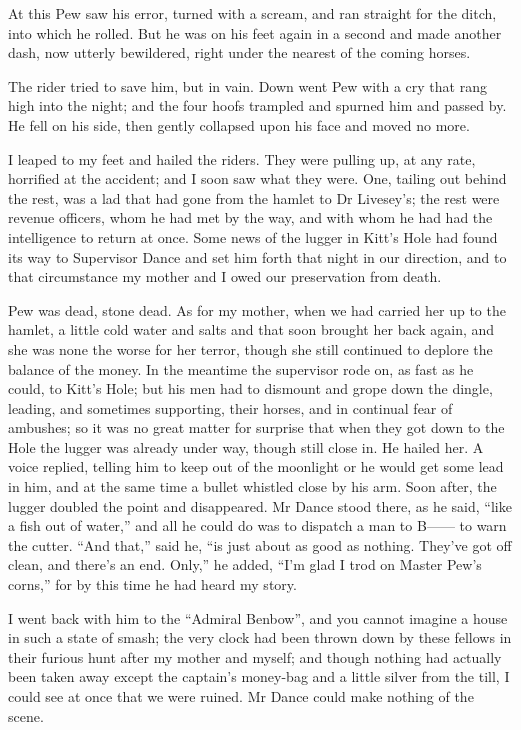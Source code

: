 At this Pew saw his error, turned with a scream, and ran straight for the ditch, into which he rolled. But he was on his feet again in a second and made another dash, now utterly bewildered, right under the nearest of the coming horses.

The rider tried to save him, but in vain. Down went Pew with a cry that rang high into the night; and the four hoofs trampled and spurned him and passed by. He fell on his side, then gently collapsed upon his face and moved no more.

I leaped to my feet and hailed the riders. They were pulling up, at any rate, horrified at the accident; and I soon saw what they were. One, tailing out behind the rest, was a lad that had gone from the hamlet to Dr Livesey’s; the rest were revenue officers, whom he had met by the way, and with whom he had had the intelligence to return at once. Some news of the lugger in Kitt’s Hole had found its way to Supervisor Dance and set him forth that night in our direction, and to that circumstance my mother and I owed our preservation from death.

Pew was dead, stone dead. As for my mother, when we had carried her up to the hamlet, a little cold water and salts and that soon brought her back again, and she was none the worse for her terror, though she still continued to deplore the balance of the money. In the meantime the supervisor rode on, as fast as he could, to Kitt’s Hole; but his men had to dismount and grope down the dingle, leading, and sometimes supporting, their horses, and in continual fear of ambushes; so it was no great matter for surprise that when they got down to the Hole the lugger was already under way, though still close in. He hailed her. A voice replied, telling him to keep out of the moonlight or he would get some lead in him, and at the same time a bullet whistled close by his arm. Soon after, the lugger doubled the point and disappeared. Mr Dance stood there, as he said, \enquote{like a fish out of water,} and all he could do was to dispatch a man to B------ to warn the cutter. \enquote{And that,} said he, \enquote{is just about as good as nothing. They’ve got off clean, and there’s an end. Only,} he added, \enquote{I’m glad I trod on Master Pew’s corns,} for by this time he had heard my story.

I went back with him to the \enquote{Admiral Benbow}, and you cannot imagine a house in such a state of smash; the very clock had been thrown down by these fellows in their furious hunt after my mother and myself; and though nothing had actually been taken away except the captain’s money-bag and a little silver from the till, I could see at once that we were ruined. Mr Dance could make nothing of the scene.

